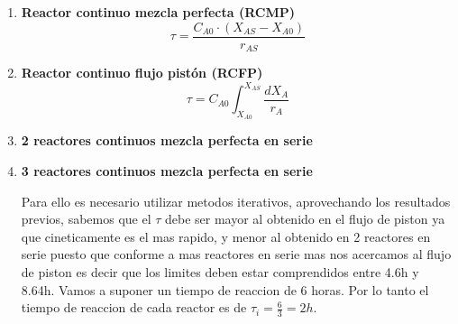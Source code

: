 \begin{enumerate}
    \item \textbf{Reactor continuo mezcla perfecta (RCMP)}
          \begin{equation*}
              \tau = \frac{C_{A0}\cdot (X_{AS}-X_{A0})}{r_{AS}}
          \end{equation*}
          \vspace{1em}
    \item \textbf{Reactor continuo flujo pistón (RCFP)}
          \begin{equation*}
              \tau = C_{A0}\int_{X_{A0}}^{X_{AS}}\frac{dX_A}{r_A}
          \end{equation*}
          \vspace{1em}
    \item \textbf{2 reactores continuos mezcla perfecta en serie}
          \vspace{1em}

    \item \textbf{3 reactores continuos mezcla perfecta en serie}

          Para ello es necesario utilizar metodos iterativos, aprovechando los resultados previos, sabemos que el $\tau$ debe ser mayor al obtenido en el flujo de piston ya que cineticamente es el mas rapido, y menor al obtenido en 2 reactores en serie puesto que conforme a mas reactores en serie mas nos acercamos al flujo de piston es decir que los limites deben estar comprendidos entre 4.6h y 8.64h. Vamos a suponer un tiempo de reaccion de 6 horas. Por lo tanto el tiempo de reaccion de cada reactor es de $\tau_i = \frac{6}{3}=2h$.


\end{enumerate}
